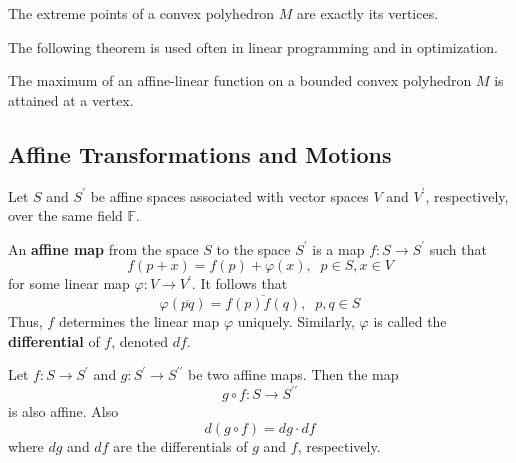 \documentclass{article}
\begin{document}
    \begin{proposition}
      The extreme points of a convex polyhedron $M$ are exactly its vertices. 
    \end{proposition}

    The following theorem is used often in linear programming and in optimization. 

    \begin{theorem}
      The maximum of an affine-linear function on a bounded convex polyhedron $M$ is attained at a vertex. 
    \end{theorem}

  \subsection{Affine Transformations and Motions}

    Let $S$ and $S^\prime$ be affine spaces associated with vector spaces $V$ and $V^\prime$, respectively, over the same field $\mathbb{F}$. 

    \begin{definition}
      An \textbf{affine map} from the space $S$ to the space $S^\prime$ is a map $f: S \longrightarrow S^\prime$ such that
      \begin{equation}
        f(p+x) = f(p) + \varphi(x), \;\; p \in S, x \in V
      \end{equation}
      for some linear map $\varphi: V \longrightarrow V^\prime$. It follows that
      \begin{equation}
        \varphi(\overline{pq}) = \overline{f(p) f(q)}, \;\; p, q \in S
      \end{equation}
      Thus, $f$ determines the linear map $\varphi$ uniquely. Similarly, $\varphi$ is called the \textbf{differential} of $f$, denoted $df$. 
    \end{definition}

    \begin{proposition}
      Let $f: S \longrightarrow S^\prime$ and $g: S^\prime \longrightarrow S^{\prime \prime}$ be two affine maps. Then the map
      \begin{equation}
        g \circ f : S \longrightarrow S^{\prime\prime}
      \end{equation}
      is also affine. Also
      \begin{equation}
        d(g \circ f) = dg \cdot df
      \end{equation}
      where $dg$ and $df$ are the differentials of $g$ and $f$, respectively. 
    \end{proposition}
\end{document}
